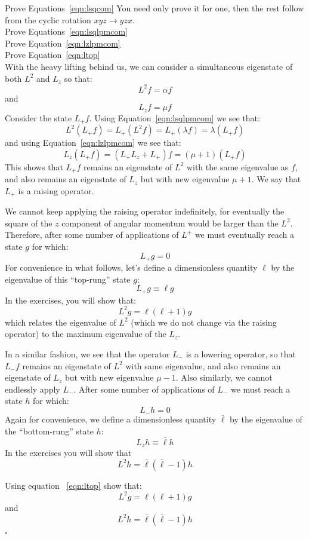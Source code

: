 \documentclass[12pt]{article}
\begin{document}
\exercise Prove Equations~\ref{eqn:lsqcom} You need only prove it for one, then the rest follow from the cyclic rotation $xyz \to yzx$.\\[5pt]

\exercise Prove Equations~\ref{eqn:lsqlpmcom}\\[5pt]

\exercise Prove Equation~\ref{eqn:lzlpmcom}\\[5pt]

\exercise Prove Equation~\ref{eqn:ltop}\\[5pt]

With the heavy lifting behind us, we can consider a simultaneous eigenstate of both $L^2$ and $L_z$ so that:
$$L^2 f = \alpha f$$
and
$$L_z f = \mu f$$
Consider the state $L_+ f$. Using Equation~\ref{eqn:lsqlpmcom} we see that:
$$L^2 (L_+ f) = L_+ (L^2 f) = L_+ (\lambda f) = \lambda (L_+ f) $$
and using Equation~\ref{eqn:lzlpmcom} we see that:
$$L_z (L_+ f) = (L_+ L_z +  L_+) f = (\mu + 1) (L_+ f) $$
This shows that $L_+ f$ remains an eigenstate of $L^2$ with the same eigenvalue as $f$, and also remains an eigenstate of $L_z$ but with new eigenvalue $\mu + 1$.  We say that $L_+$ is a raising operator.

We cannot keep applying the raising operator indefinitely, for eventually the square of the $z$ component of angular momentum would be larger than the $L^2$.  Therefore, after some number of applications of $L^+$ we must eventually reach a state $g$ for which:
$$L_+ g = 0$$
For convenience in what follows, let's define a dimensionless quantity $\ell$ by the eigenvalue of this ``top-rung'' state $g$:
$$L_+ g \equiv \ell  g$$
In the exercises, you will show that:
$$L^2 g =  \ell (\ell+1) g$$
which relates the eigenvalue of $L^2$ (which we do not change via the raising operator) to the maximum eigenvalue of the $L_z$.

In a similar fashion, we see that the operator $L_-$ is a lowering
operator, so that $L_-f$ remains an eigenstate of $L^2$ with same
eigenvalue, and also remains an eigenstate of $L_z$ but with new
eigenvalue $\mu - 1$.  Also similarly, we cannot endlessly apply
$L_-$.  After some number of applications of $L_-$ we must reach a
state $h$ for which:
$$L_- h = 0$$
Again for convenience, we define a dimensionless quantity $\bar{\ell}$ by the eigenvalue of the ``bottom-rung'' state $h$:
$$L_z h \equiv \bar{\ell}  h$$
In the exercises you will show that
$$L^2 h =  \bar{\ell} (\bar{\ell}-1) h$$

\exercise Using equation ~\ref{eqn:ltop} show that:
$$L^2 g =  \ell (\ell+1) g$$
and
$$L^2 h =  \bar{\ell} (\bar{\ell}-1) h$$
$\square$\\[5pt]
\end{document}
